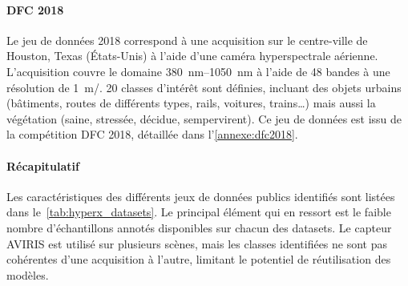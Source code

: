 
\paragraph{DFC 2018}
Le jeu de données  2018 correspond à une acquisition sur le centre-ville de Houston, Texas (États-Unis) à l'aide d'une caméra hyperspectrale aérienne. L'acquisition couvre le domaine \SIrange{380}{1050}{\nano\meter} à l'aide de 48 bandes à une résolution de \SI{1}{\meter/\px}. 20 classes d'intérêt sont définies, incluant des objets urbains (bâtiments, routes de différents types, rails, voitures, trains\dots) mais aussi la végétation (saine, stressée, décidue, sempervirent). Ce jeu de données est issu de la compétition \glsdesc{DFC} 2018, détaillée dans l'\cref{annexe:dfc2018}.

\paragraph{Récapitulatif}

Les caractéristiques des différents jeux de données publics identifiés sont listées dans le~\cref{tab:hyperx_datasets}. Le principal élément qui en ressort est le faible nombre d'échantillons annotés disponibles sur chacun des datasets. Le capteur \gls{AVIRIS} est utilisé sur plusieurs scènes, mais les classes identifiées ne sont pas cohérentes d'une acquisition à l'autre, limitant le potentiel de réutilisation des modèles.

